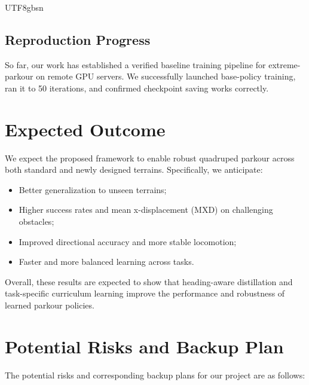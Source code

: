 \documentclass[conference]{IEEEtran}
\begin{document}
\begin{CJK}{UTF8}{gbsn}
\subsection{Reproduction Progress}

So far, our work has established a verified baseline training pipeline for extreme-parkour on remote GPU servers. We successfully launched base-policy training, ran it to 50 iterations, and confirmed checkpoint saving works correctly.

\section{Expected Outcome}
\setlength{\parindent}{2em}
We expect the proposed framework to enable robust quadruped parkour across both standard and newly designed terrains. Specifically, we anticipate:

\begin{itemize}
\item Better generalization to unseen terrains;
\item Higher success rates and mean x-displacement (MXD) on challenging obstacles;
\item Improved directional accuracy and more stable locomotion;
\item Faster and more balanced learning across tasks.
\end{itemize}

Overall, these results are expected to show that heading-aware distillation and task-specific curriculum learning improve the performance and robustness of learned parkour policies.

\section{Potential Risks and Backup Plan}
\setlength{\parindent}{2em}

The potential risks and corresponding backup plans for our project are as follows:


\end{CJK}
\end{document}
